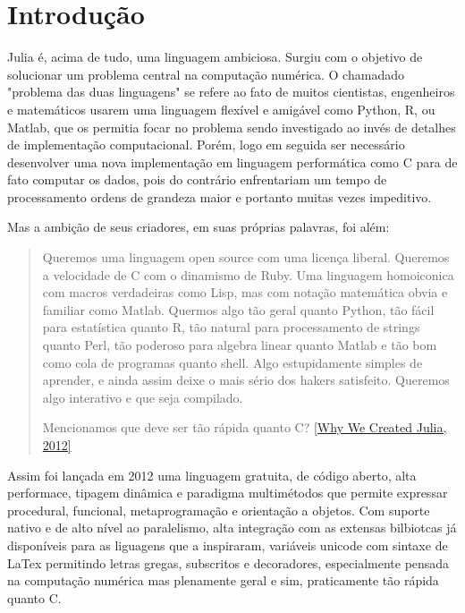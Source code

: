 % 



\chapter{ Introdu\c{c}\~{a}o}

Julia é, acima de tudo, uma linguagem ambiciosa. 
Surgiu com o objetivo de solucionar um problema central na computação numérica. O chamadado "problema das duas linguagens" se refere ao fato de muitos cientistas, engenheiros e matemáticos usarem uma linguagem flexível e amigável como Python, R, ou Matlab, que os permitia focar no problema sendo investigado ao invés de detalhes de implementação computacional. Porém, logo em seguida ser necessário desenvolver uma nova implementação em linguagem performática como C para de fato computar os dados, pois do contrário enfrentariam um tempo de processamento ordens de grandeza maior e portanto muitas vezes impeditivo. \cite{Lauwens2019}

Mas a ambição de seus criadores, em suas próprias palavras, foi além:

\begin{quote}
   Queremos uma linguagem open source com uma licença liberal. Queremos a velocidade de C com o dinamismo de Ruby. Uma linguagem homoiconica com macros verdadeiras como Lisp, mas com notação matemática obvia e familiar como Matlab. Quermos algo tão geral quanto Python, tão fácil para estatística quanto R, tão natural para processamento de strings quanto Perl, tão poderoso para algebra linear quanto Matlab e tão bom como cola de programas quanto shell. Algo estupidamente simples de aprender, e ainda assim deixe o mais sério dos hakers satisfeito. Queremos algo interativo e que seja compilado. 
   
   Mencionamos que deve ser tão rápida quanto C? 
   \href{https://julialang.org/blog/2012/02/why-we-created-julia/}{[Why We Created Julia, 2012]}
   
   
\end{quote}

Assim foi lançada em 2012 uma linguagem gratuita, de código aberto, alta performace, tipagem dinâmica e paradigma multimétodos que permite expressar procedural, funcional, metaprogramação e orientação a objetos. Com suporte nativo e de alto nível ao paralelismo, alta integração com as extensas bilbiotcas já disponíveis para as liguagens que a inspiraram, variáveis unicode com sintaxe de LaTex permitindo letras gregas, subscritos e decoradores, especialmente pensada na computação numérica mas plenamente geral e sim, praticamente tão rápida quanto C. \cite{Lobianco2019,Bezanson2017}

